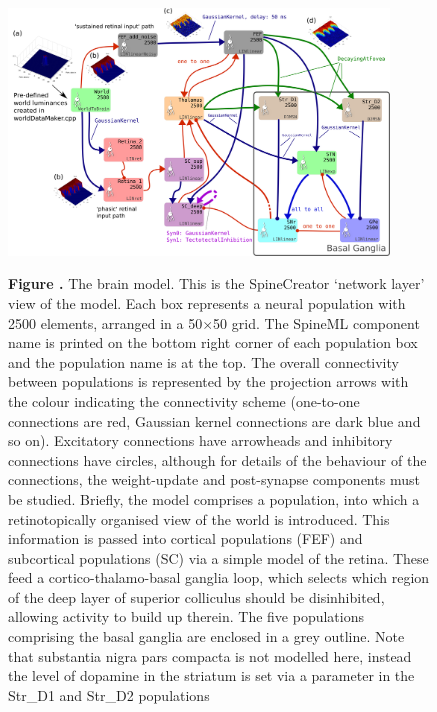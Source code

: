 \documentclass{frontiersSCNS}
\begin{document}
\begin{figure}[t]
\begin{center}
\includegraphics[width=0.9\textwidth]{./figures/Brain_Model.png}
\end{center}
\textbf{\label{brain_model} Figure .}
{ The brain model. This is the SpineCreator `network layer' view of
the model. Each box represents a neural population with 2500 elements,
arranged in a 50$\times$50 grid. The SpineML component name is printed
on the bottom right corner of each population box and the population
name is at the top. The overall connectivity between populations is
represented by the projection arrows with the colour indicating the
connectivity scheme (one-to-one connections are red, Gaussian kernel
connections are dark blue and so on). Excitatory connections have
arrowheads and inhibitory connections have circles, although for
details of the behaviour of the connections, the weight-update and
post-synapse components must be studied. Briefly, the model comprises
a  population, into which a retinotopically organised view of
the world is introduced. This information is passed into cortical
populations (FEF) and subcortical populations (SC) via a simple model
of the retina. These feed a cortico-thalamo-basal ganglia loop, which
selects which region of the deep layer of superior colliculus should
be disinhibited, allowing activity to build up therein. The five
populations comprising the basal ganglia are enclosed in a grey
outline. Note that substantia nigra pars compacta is not modelled
here, instead the level of dopamine in the striatum is set via a
parameter in the Str\_D1 and Str\_D2 populations}
\end{figure}
\end{document}
